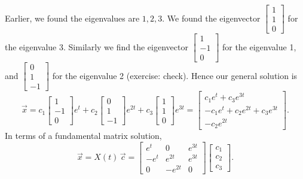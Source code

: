 \begin{exampleSol}
Earlier, we found the eigenvalues are $1,2,3$.  We found the eigenvector
$\left[ \begin{smallmatrix} 1 \\ 1 \\ 0 \end{smallmatrix} \right]$
for the eigenvalue 3.  Similarly
we find the eigenvector 
$\left[ \begin{smallmatrix} 1 \\ -1 \\ 0 \end{smallmatrix} \right]$
for the eigenvalue 1, and 
$\left[ \begin{smallmatrix} 0 \\ 1 \\ -1 \end{smallmatrix} \right]$
for the eigenvalue 2 (exercise: check).
Hence our general solution is
\begin{equation*}
\vec{x} =
c_1
\begin{bmatrix}
1 \\ -1 \\ 0
\end{bmatrix}
e^t
+
c_2
\begin{bmatrix}
0 \\ 1 \\ -1
\end{bmatrix}
e^{2t}
+
c_3
\begin{bmatrix}
1 \\ 1 \\ 0
\end{bmatrix}
e^{3t} 
=
\begin{bmatrix}
c_1 e^t+c_3 e^{3t} \\ -c_1 e^t + c_2 e^{2t} + c_3 e^{3t} \\ - c_2 e^{2t}
\end{bmatrix} .
\end{equation*}
In terms of a fundamental matrix solution,
\begin{equation*}
\vec{x} = X(t)\, \vec{c}
=
\begin{bmatrix}
e^t & 0 & e^{3t} \\
-e^t & e^{2t} & e^{3t} \\
0 & -e^{2t} & 0
\end{bmatrix}
\begin{bmatrix}
c_1 \\ c_2 \\ c_3
\end{bmatrix} .
\end{equation*}
\end{exampleSol}

